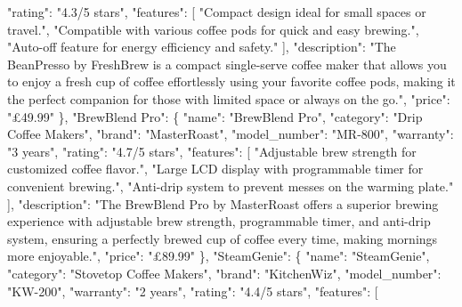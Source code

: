 \documentclass[
  letterpaper,
  DIV=11,
  numbers=noendperiod]{scrreprt}
\newenvironment{Shaded}{\begin{snugshade}}{\end{snugshade}}
\newcommand{\NormalTok}[1]{\textcolor[rgb]{0.00,0.23,0.31}{#1}}
\newcommand{\StringTok}[1]{\textcolor[rgb]{0.13,0.47,0.30}{#1}}
\begin{document}
\begin{Shaded}
\begin{Highlighting}[]
      \StringTok{"rating"}\NormalTok{: }\StringTok{"4.3/5 stars"}\NormalTok{,}
      \StringTok{"features"}\NormalTok{: [}
        \StringTok{"Compact design ideal for small spaces or travel."}\NormalTok{,}
        \StringTok{"Compatible with various coffee pods for quick and easy brewing."}\NormalTok{,}
        \StringTok{"Auto{-}off feature for energy efficiency and safety."}
\NormalTok{      ],}
      \StringTok{"description"}\NormalTok{: }\StringTok{"The BeanPresso by FreshBrew is a compact single{-}serve coffee maker that allows you to enjoy a fresh cup of coffee effortlessly using your favorite coffee pods, making it the perfect companion for those with limited space or always on the go."}\NormalTok{,}
      \StringTok{"price"}\NormalTok{: }\StringTok{"£49.99"}
\NormalTok{    \},}
    \StringTok{"BrewBlend Pro"}\NormalTok{: \{}
      \StringTok{"name"}\NormalTok{: }\StringTok{"BrewBlend Pro"}\NormalTok{,}
      \StringTok{"category"}\NormalTok{: }\StringTok{"Drip Coffee Makers"}\NormalTok{,}
      \StringTok{"brand"}\NormalTok{: }\StringTok{"MasterRoast"}\NormalTok{,}
      \StringTok{"model\_number"}\NormalTok{: }\StringTok{"MR{-}800"}\NormalTok{,}
      \StringTok{"warranty"}\NormalTok{: }\StringTok{"3 years"}\NormalTok{,}
      \StringTok{"rating"}\NormalTok{: }\StringTok{"4.7/5 stars"}\NormalTok{,}
      \StringTok{"features"}\NormalTok{: [}
        \StringTok{"Adjustable brew strength for customized coffee flavor."}\NormalTok{,}
        \StringTok{"Large LCD display with programmable timer for convenient brewing."}\NormalTok{,}
        \StringTok{"Anti{-}drip system to prevent messes on the warming plate."}
\NormalTok{      ],}
      \StringTok{"description"}\NormalTok{: }\StringTok{"The BrewBlend Pro by MasterRoast offers a superior brewing experience with adjustable brew strength, programmable timer, and anti{-}drip system, ensuring a perfectly brewed cup of coffee every time, making mornings more enjoyable."}\NormalTok{,}
      \StringTok{"price"}\NormalTok{: }\StringTok{"£89.99"}
\NormalTok{    \},}
    \StringTok{"SteamGenie"}\NormalTok{: \{}
      \StringTok{"name"}\NormalTok{: }\StringTok{"SteamGenie"}\NormalTok{,}
      \StringTok{"category"}\NormalTok{: }\StringTok{"Stovetop Coffee Makers"}\NormalTok{,}
      \StringTok{"brand"}\NormalTok{: }\StringTok{"KitchenWiz"}\NormalTok{,}
      \StringTok{"model\_number"}\NormalTok{: }\StringTok{"KW{-}200"}\NormalTok{,}
      \StringTok{"warranty"}\NormalTok{: }\StringTok{"2 years"}\NormalTok{,}
      \StringTok{"rating"}\NormalTok{: }\StringTok{"4.4/5 stars"}\NormalTok{,}
      \StringTok{"features"}\NormalTok{: [}

\end{Highlighting}
\end{Shaded}
\end{document}

